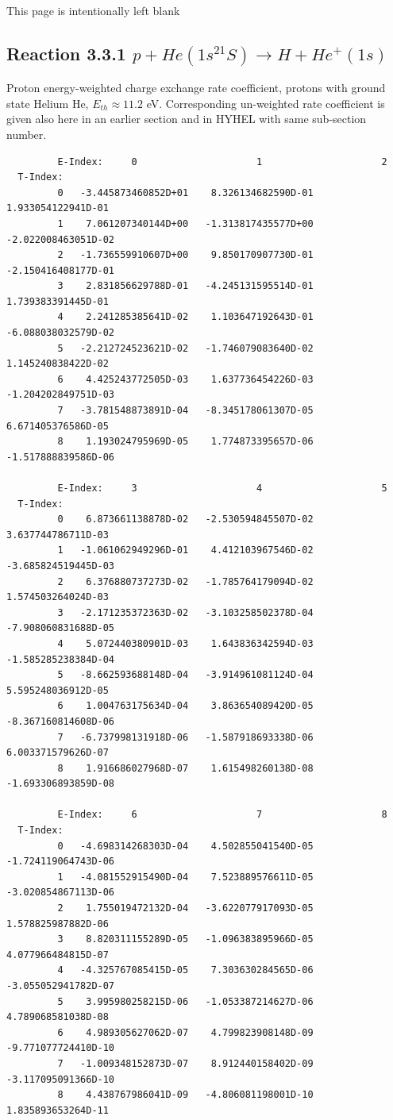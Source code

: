 \documentclass[12pt,dvipdfmx]{article}
\begin{document}
\newpage
This page is intentionally left blank
\newpage
\subsection{
Reaction 3.3.1  $  p + He(1s^21S) \rightarrow  H + He^+(1s) $
}
Proton energy-weighted charge exchange rate coefficient,
protons with ground state Helium He, $E_{th} \approx 11.2$ eV.
Corresponding un-weighted rate coefficient is given also here in an earlier section and in HYHEL with same sub-section number.


\begin{small}\begin{verbatim}
         E-Index:     0                     1                     2
  T-Index:
         0   -3.445873460852D+01    8.326134682590D-01    1.933054122941D-01
         1    7.061207340144D+00   -1.313817435577D+00   -2.022008463051D-02
         2   -1.736559910607D+00    9.850170907730D-01   -2.150416408177D-01
         3    2.831856629788D-01   -4.245131595514D-01    1.739383391445D-01
         4    2.241285385641D-02    1.103647192643D-01   -6.088038032579D-02
         5   -2.212724523621D-02   -1.746079083640D-02    1.145240838422D-02
         6    4.425243772505D-03    1.637736454226D-03   -1.204202849751D-03
         7   -3.781548873891D-04   -8.345178061307D-05    6.671405376586D-05
         8    1.193024795969D-05    1.774873395657D-06   -1.517888839586D-06

         E-Index:     3                     4                     5
  T-Index:
         0    6.873661138878D-02   -2.530594845507D-02    3.637744786711D-03
         1   -1.061062949296D-01    4.412103967546D-02   -3.685824519445D-03
         2    6.376880737273D-02   -1.785764179094D-02    1.574503264024D-03
         3   -2.171235372363D-02   -3.103258502378D-04   -7.908060831688D-05
         4    5.072440380901D-03    1.643836342594D-03   -1.585285238384D-04
         5   -8.662593688148D-04   -3.914961081124D-04    5.595248036912D-05
         6    1.004763175634D-04    3.863654089420D-05   -8.367160814608D-06
         7   -6.737998131918D-06   -1.587918693338D-06    6.003371579626D-07
         8    1.916686027968D-07    1.615498260138D-08   -1.693306893859D-08

         E-Index:     6                     7                     8
  T-Index:
         0   -4.698314268303D-04    4.502855041540D-05   -1.724119064743D-06
         1   -4.081552915490D-04    7.523889576611D-05   -3.020854867113D-06
         2    1.755019472132D-04   -3.622077917093D-05    1.578825987882D-06
         3    8.820311155289D-05   -1.096383895966D-05    4.077966484815D-07
         4   -4.325767085415D-05    7.303630284565D-06   -3.055052941782D-07
         5    3.995980258215D-06   -1.053387214627D-06    4.789068581038D-08
         6    4.989305627062D-07    4.799823908148D-09   -9.771077724410D-10
         7   -1.009348152873D-07    8.912440158402D-09   -3.117095091366D-10
         8    4.438767986041D-09   -4.806081198001D-10    1.835893653264D-11


\end{verbatim}
\end{small}
\end{document}
